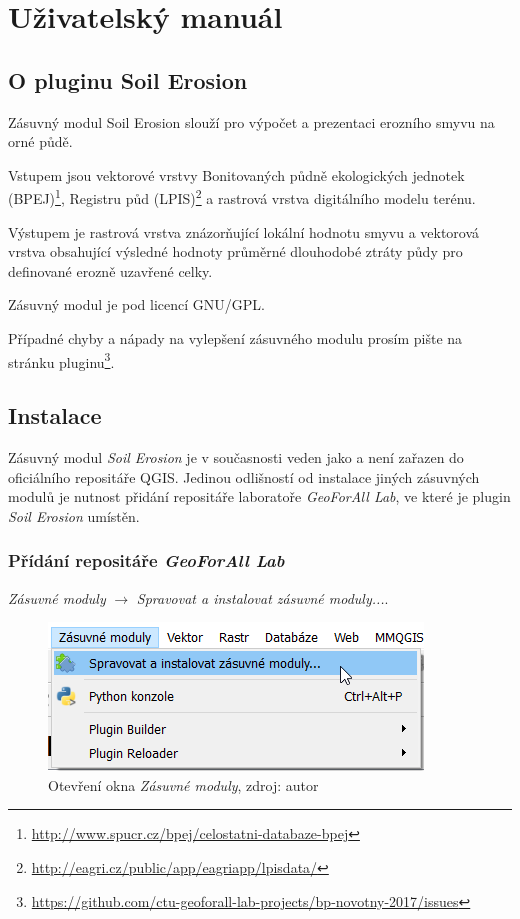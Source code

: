\chapter{Uživatelský manuál}
\label{6-manual}
\section{O pluginu Soil Erosion}
\label{o_pluginu}
Zásuvný modul Soil Erosion slouží pro výpočet a prezentaci erozního smyvu na orné půdě.

Vstupem jsou vektorové vrstvy Bonitovaných půdně ekologických jednotek (BPEJ)\footnote{\url{http://www.spucr.cz/bpej/celostatni-databaze-bpej}}, Registru půd (LPIS)\footnote{\url{http://eagri.cz/public/app/eagriapp/lpisdata/}} a rastrová vrstva digitálního modelu terénu.

Výstupem je rastrová vrstva znázorňující lokální hodnotu smyvu
a vektorová vrstva obsahující výsledné hodnoty průměrné
dlouhodobé ztráty půdy pro definované erozně uzavřené celky.

Zásuvný modul je pod licencí GNU/GPL.

Případné chyby a nápady na vylepšení zásuvného modulu prosím pište na stránku pluginu\footnote{\url{https://github.com/ctu-geoforall-lab-projects/bp-novotny-2017/issues}}.

\section{Instalace}
\label{manual_instalace}
Zásuvný modul \textit{Soil Erosion} je v současnosti veden jako  a není zařazen do oficiálního repositáře QGIS. Jedinou odlišností od instalace jiných zásuvných modulů je nutnost přidání repositáře laboratoře \textit{GeoForAll Lab}, ve které je plugin \textit{Soil Erosion} umístěn.


\subsection{Přídání repositáře \textit{GeoForAll Lab}}
\textit{Zásuvné moduly} $\rightarrow$ \textit{Spravovat a  instalovat zásuvné moduly...}.

	\begin{figure}[H] \centering
		\includegraphics[width=.6\textwidth]{./pictures/otevreni_okna_zasuvne_moduly.png}
		\caption[Otevření okna \textit{Zásuvné
moduly}]{Otevření okna \textit{Zásuvné moduly}, zdroj: autor}
		\label{fig:manual_otevreni_okna_zasuvne_moduly}
 	\end{figure}
 	
